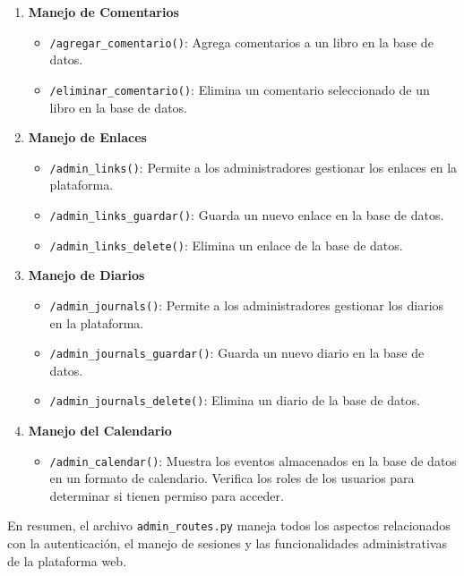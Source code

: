 \documentclass[a4paper, 12pt]{book}
\begin{document}
\begin{enumerate}
    \item \textbf{Manejo de Comentarios}
    \begin{itemize}
        \item \texttt{/agregar\_comentario()}: Agrega comentarios a un libro en la base de datos.
        \item \texttt{/eliminar\_comentario()}: Elimina un comentario seleccionado de un libro en la base de datos.
    \end{itemize}

    \item \textbf{Manejo de Enlaces}
    \begin{itemize}
        \item \texttt{/admin\_links()}: Permite a los administradores gestionar los enlaces en la plataforma.
        \item \texttt{/admin\_links\_guardar()}: Guarda un nuevo enlace en la base de datos.
        \item \texttt{/admin\_links\_delete()}: Elimina un enlace de la base de datos.
    \end{itemize}

    \item \textbf{Manejo de Diarios}
    \begin{itemize}
        \item \texttt{/admin\_journals()}: Permite a los administradores gestionar los diarios en la plataforma.
        \item \texttt{/admin\_journals\_guardar()}: Guarda un nuevo diario en la base de datos.
        \item \texttt{/admin\_journals\_delete()}: Elimina un diario de la base de datos.
    \end{itemize}

    \item \textbf{Manejo del Calendario}
    \begin{itemize}
        \item \texttt{/admin\_calendar()}: Muestra los eventos almacenados en la base de datos en un formato de calendario. Verifica los roles de los 
        usuarios para determinar si tienen permiso para acceder.
    \end{itemize}
\end{enumerate}

En resumen, el archivo \texttt{admin\_routes.py} maneja todos los aspectos relacionados con la autenticación, el manejo de sesiones y las funcionalidades administrativas de la plataforma web.
\end{document}
